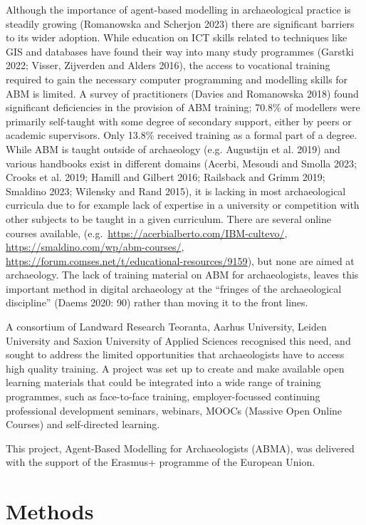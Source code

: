 \documentclass[
]{article}
\begin{document}
Although the importance of agent-based modelling in archaeological practice is steadily growing (Romanowska and Scherjon 2023) there are significant barriers to its wider adoption. While education on ICT skills related to techniques like GIS and databases have found their way into many study programmes (Garstki 2022; Visser, Zijverden and Alders 2016), the access to vocational training required to gain the necessary computer programming and modelling skills for ABM is limited. A survey of practitioners (Davies and Romanowska 2018) found significant deficiencies in the provision of ABM training; 70.8\% of modellers were primarily self-taught with some degree of secondary support, either by peers or academic supervisors. Only 13.8\% received training as a formal part of a degree. While ABM is taught outside of archaeology (e.g. Augustijn et al. 2019) and various handbooks exist in different domains (Acerbi, Mesoudi and Smolla 2023; Crooks et al. 2019; Hamill and Gilbert 2016; Railsback and Grimm 2019; Smaldino 2023; Wilensky and Rand 2015), it is lacking in most archaeological curricula due to for example lack of expertise in a university or competition with other subjects to be taught in a given curriculum. There are several online courses available, (e.g.~\url{https://acerbialberto.com/IBM-cultevo/}, \url{https://smaldino.com/wp/abm-courses/}, \url{https://forum.comses.net/t/educational-resources/9159}), but none are aimed at archaeology. The lack of training material on ABM for archaeologists, leaves this important method in digital archaeology at the ``fringes of the archaeological discipline'' (Daems 2020: 90) rather than moving it to the front lines.

A consortium of Landward Research Teoranta, Aarhus University, Leiden University and Saxion University of Applied Sciences recognised this need, and sought to address the limited opportunities that archaeologists have to access high quality training. A project was set up to create and make available open learning materials that could be integrated into a wide range of training programmes, such as face-to-face training, employer-focussed continuing professional development seminars, webinars, MOOCs (Massive Open Online Courses) and self-directed learning.

This project, Agent-Based Modelling for Archaeologists (ABMA), was delivered with the support of the Erasmus+ programme of the European Union.

\hypertarget{methods}{%
\section{Methods}\label{methods}}
\end{document}
